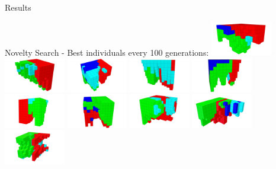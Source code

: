 \documentclass{beamer}
\begin{document}
\begin{frame}[allowframebreaks]{Results}
\begin{minipage}{\textwidth}
\begin{block}{Novelty Search - Best individuals every 100 generations:}
\includegraphics[width=0.2\textwidth]{figures/Robots/n_4_g_100.jpg}
\includegraphics[width=0.2\textwidth]{figures/Robots/n_4_g_200.jpg}
\includegraphics[width=0.2\textwidth]{figures/Robots/n_4_g_300.jpg}
\includegraphics[width=0.2\textwidth]{figures/Robots/n_4_g_400.jpg}
\includegraphics[width=0.2\textwidth]{figures/Robots/n_4_g_500.jpg}\\
\includegraphics[width=0.2\textwidth]{figures/Robots/n_4_g_600.jpg}
\includegraphics[width=0.2\textwidth]{figures/Robots/n_4_g_700.jpg}
\includegraphics[width=0.2\textwidth]{figures/Robots/n_4_g_800.jpg}
\includegraphics[width=0.2\textwidth]{figures/Robots/n_4_g_900.jpg}
\includegraphics[width=0.2\textwidth]{figures/Robots/n_4_g_1000.jpg}
\end{block}


\end{minipage}
\end{frame}
\end{document}
